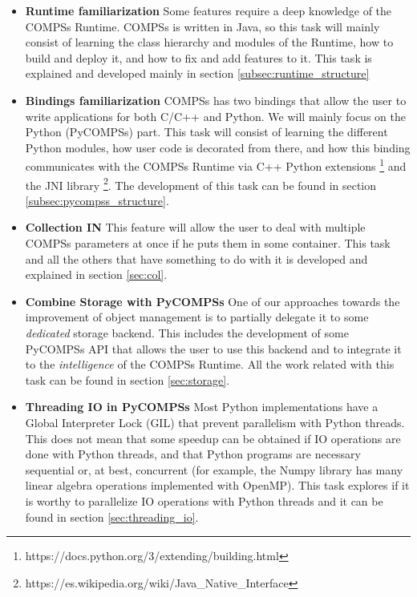 \begin{itemize}
\item \textbf{Runtime familiarization} Some features require a deep knowledge of the COMPSs Runtime. COMPSs is written in Java, so this task will mainly consist of learning the class hierarchy and modules of the Runtime, how to build and deploy it, and how to fix and add features to it. This task is explained and developed mainly in section \ref{subsec:runtime_structure}
\item \textbf{Bindings familiarization} COMPSs has two bindings that allow the user to write applications for both C/C++ and Python. We will mainly focus on the Python (PyCOMPSs) part. This task will consist of learning the different Python modules, how user code is decorated from there, and how this binding communicates with the COMPSs Runtime via C++ Python extensions \footnote{https://docs.python.org/3/extending/building.html} and the JNI library \footnote{https://es.wikipedia.org/wiki/Java\_Native\_Interface}. The development of this task can be found in section \ref{subsec:pycompss_structure}.

\item \textbf{Collection IN} This feature will allow the user to deal with multiple COMPSs parameters at once if he puts them in some container. This task and all the others that have something to do with it is developed and explained in section \ref{sec:col}.

\item \textbf{Combine Storage with PyCOMPSs} One of our approaches towards the improvement of object management is to partially delegate it to some \textit{dedicated} storage backend. This includes the development of some PyCOMPSs API that allows the user to use this backend and to integrate it to the \textit{intelligence} of the COMPSs Runtime. All the work related with this task can be found in section \ref{sec:storage}.

\item \textbf{Threading IO in PyCOMPSs} Most Python implementations have a Global Interpreter Lock (GIL) that prevent parallelism with Python threads. This does not mean that some speedup can be obtained if IO operations are done with Python threads, and that Python programs are necessary sequential or, at best, concurrent (for example, the Numpy library has many linear algebra operations implemented with OpenMP). This task explores if it is worthy to parallelize IO operations with Python threads and it can be found in section \ref{sec:threading_io}.

\end{itemize}

